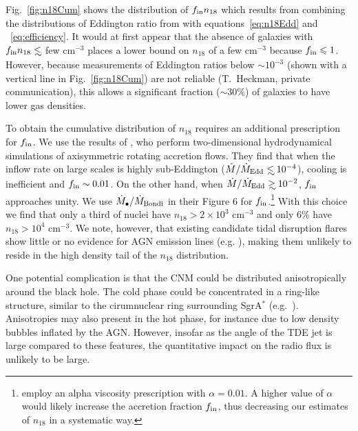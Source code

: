 \documentclass[usenatbib,fleqn]{mnras}
\newcommand\lsim{\mathrel{\rlap{\lower4pt\hbox{\hskip1pt$\sim$}}
    \raise1pt\hbox{$<$}}}
\newcommand\gsim{\mathrel{\rlap{\lower4pt\hbox{\hskip1pt$\sim$}}
    \raise1pt\hbox{$>$}}}
\begin{document}
Fig.~\ref{fig:n18Cum} shows the distribution of $f_{\rm in} n_{18}$
which results from combining the distributions of Eddington ratio from
\citet{Kauffmann&Heckman2009} with equations~\eqref{eq:n18Edd} and
~\eqref{eq:efficiency}.  It would at first appear that the absence of
galaxies with $f_{\rm in }n_{18} \lsim$ few cm$^{-3}$ places a lower
bound on $n_{18}$ of a few cm$^{-3}$ because $f_{\rm in} \le 1$.
However, because measurements of Eddington ratios below $\sim 10^{-3}$
(shown with a vertical line in Fig.~\ref{fig:n18Cum}) are not reliable
(T.~Heckman, private communication), this allows a significant fraction
($\sim 30\%$) of galaxies to have lower gas densities.

To obtain the cumulative distribution of $n_{18}$ requires an
additional prescription for $f_{\rm in}$.  We use the results of
\citet{Li+2013}, who perform two-dimensional hydrodynamical
simulations of axisymmetric rotating accretion flows.  They find that
when the inflow rate on large scales is highly sub-Eddington
($\dot{M}/\dot{M}_{\rm Edd} \lsim 10^{-4}$), cooling is inefficient
and $f_{\rm in}\sim 0.01$. On the other hand, when
$\dot{M}/\dot{M}_{\rm Edd}\gsim 10^{-2}$, $f_{\rm in}$ approaches
unity.  We use $\dot{M}_{\bullet}/\dot{M}_{\rm Bondi}$ in their Figure
6 for $f_{\rm in}$.\footnote{\citet{Li+2013} employ an alpha viscosity
  prescription with $\alpha=0.01$.  A higher value of $\alpha$ would
  likely increase the accretion fraction $f_{\rm in}$, thus decreasing
  our estimates of $n_{18}$ in a systematic way.}  With this choice we
find that only a third of nuclei have $n_{18}>2\times 10^{3}$
cm$^{-3}$ and only 6\% have $n_{18}>10^{4}$ cm$^{-3}$.  We note,
however, that existing candidate tidal disruption flares show little
or no evidence for AGN emission lines (e.g. \citealt{van-Velzen+2011,
  Arcavi+2014}), making them unlikely to reside in the high density
tail of the $n_{18}$ distribution.

One potential complication is that the CNM could be distributed
anisotropically around the black hole.  The cold phase could be
concentrated in a ring-like structure, similar to the cirumnuclear
ring surrounding SgrA$^{*}$ (e.g.~\citealt{Lau+13}).  Anisotropies may
also present in the hot phase, for instance due to low density bubbles
inflated by the AGN.  However, insofar as the angle of the TDE jet is
large compared to these features, the quantitative impact on the radio
flux is unlikely to be large.
\end{document}
